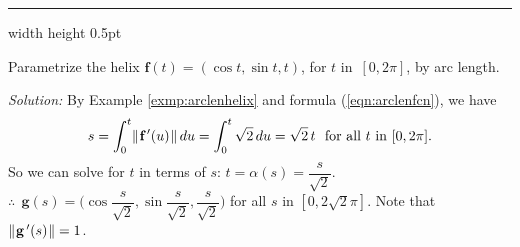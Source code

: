 \vspace{2mm}
\hrule width \textwidth height 0.5pt
\begin{exmp}\label{exmp:arcparamhelix}
 Parametrize the helix $\textbf{f}(t) = (\cos t , \sin t , t)$, for $t$ in~$[0,2\pi]$, by arc length.\vspace{1mm}
 \par\noindent \emph{Solution:} By Example \ref{exmp:arclenhelix} and formula (\ref{eqn:arclenfcn}), we have
 \begin{displaymath}
  s = \int_{0}^{t} \lVert\mspace{1mu}\textbf{f}\,'(u)\mspace{1mu}\rVert\,du = \int_{0}^{t} \sqrt{2} \,du = \sqrt{2}\,t
  \text{~~for all $t$ in $[0,2\pi]$.}
 \end{displaymath}
 So we can solve for $t$ in terms of $s$: $t = \alpha(s) = \dfrac{s}{\sqrt{2}}$.\\$\therefore ~~ \textbf{g}(s) =
 \biggl( \cos \dfrac{s}{\sqrt{2}} , \sin \dfrac{s}{\sqrt{2}} , \dfrac{s}{\sqrt{2}} \biggr)$ for all $s$
 in $[0,2\sqrt{2} \pi]$. 
 Note that $\lVert\mspace{1mu}\textbf{g}\,'(s)\mspace{1mu}\rVert = 1$.
\end{exmp}

